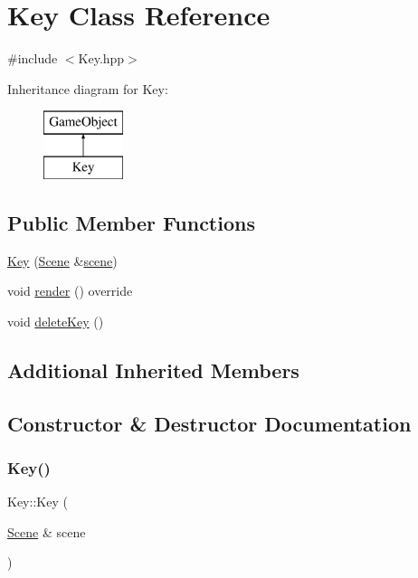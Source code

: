 \hypertarget{class_key}{}\section{Key Class Reference}
\label{class_key}


{\ttfamily \#include $<$Key.\+hpp$>$}

Inheritance diagram for Key\+:\begin{figure}[H]
\begin{center}
\leavevmode
\includegraphics[height=2.000000cm]{class_key}
\end{center}
\end{figure}
\subsection*{Public Member Functions}
\begin{DoxyCompactItemize}
\item 
\mbox{\hyperlink{class_key_aaf6863a25f5bff8c2e090d2742bdd8c7}{Key}} (\mbox{\hyperlink{class_scene}{Scene}} \&\mbox{\hyperlink{class_game_object_aeea61de934e13603696b4ed00e9fe42e}{scene}})
\item 
void \mbox{\hyperlink{class_key_ad7047dce6eba1702bf776cb6ffeab3a6}{render}} () override
\item 
void \mbox{\hyperlink{class_key_a6c31c0a20e5bcb5a3e0399498b9d0c14}{delete\+Key}} ()
\end{DoxyCompactItemize}
\subsection*{Additional Inherited Members}


\subsection{Constructor \& Destructor Documentation}
\mbox{\label{class_key_aaf6863a25f5bff8c2e090d2742bdd8c7}} 
\subsubsection{\texorpdfstring{Key()}{Key()}}
{\footnotesize\ttfamily Key\+::\+Key (\begin{DoxyParamCaption}\item[{\mbox{\hyperlink{class_scene}{Scene}} \&}]{scene }\end{DoxyParamCaption})}



